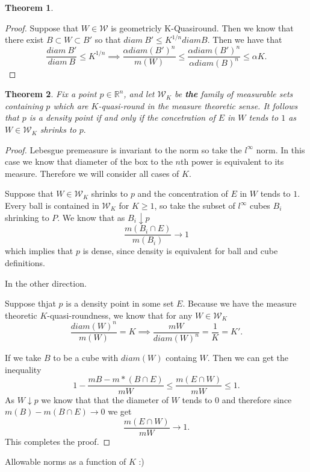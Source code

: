 \documentclass[letter]{article}
\newtheorem{theorem}{Theorem}
\newenvironment{menumerate}{%
  \edef\backupindent{\the\parindent}%
  \enumerate%
  \setlength{\parindent}{\backupindent}%
}{\endenumerate}
\begin{document}
\begin{menumerate}
\begin{theorem}
	\end{theorem}
	\begin{proof}
		Suppose that $W \in \mathcal{W} $ is geometricly K-Quasiround. Then we know that there exist $B \subset W \subset B'$
		so that $diam\ B' \leq K^{1/n} diam B.$
		Then we have that 
		\begin{equation}
				 \frac{diam\ B'}{diam\ B} \leq K^{1/n} \implies \frac{\alpha diam(B')^n}{m(W)} \leq \frac{\alpha diam(B')^n}{\alpha diam(B)^n} \leq \alpha K.
		\end{equation}
	\end{proof}
	\begin{theorem}
		Fix a point $p \in \mathbb{R}^n$, and let 
		$\mathcal{W}_K$ be \textbf{the} family of measurable sets containing $p$ which are $K$-quasi-round in the measure theoretic sense. It follows that $p$ is a density point if and only if the concetration of $E$ in $W$ tends to $1$ as $W \in \mathcal{W}_K$ shrinks to $p.$
	\end{theorem}
	\begin{proof}
		Lebesgue premeasure is invariant to the norm so take the $l^\infty$ norm. In this case we know that diameter of the box to the $n$th power 
		is equivalent to its measure. Therefore we will consider all cases of $K.$

		Suppose that $W \in \mathcal{W}_K$ shrinks to $p$ and the concentration of $E$ in $W$ tends to $1$. Every ball is contained in $\mathcal{W}_K$ for $K \geq 1$, so take
		the subset of $l^{\infty}$ cubes $B_i$ shrinking to $P$.
		We know that as $B_i \downarrow p$ 
		\begin{equation}
			\frac{m(B_i \cap E)}{m(B_i)} \to 1
		\end{equation}
		which implies that $p$ is dense, since density is equivalent for ball and cube definitions.

		In the other direction.

		Suppose thjat $p$ is a density point in some set $E.$ Because we have the measure theoretic $K$-quasi-roundness, we know that for any $W \in \mathcal{W}_K$
		\begin{equation}
			\frac{diam(W)^n}{m(W)} = K \implies \frac{mW}{diam(W)^n} = \frac{1}{K} =K'.
		\end{equation}

		If we take $B$ to be a cube with $diam(W)$ containg $W$. Then we can get the inequality
		\begin{equation}
			1 - \frac{mB - m*(B \cap E)}{mW} \leq \frac{m(E \cap W)}{mW} \leq 1.
		\end{equation}
		As $W \downarrow p$ we know that that the diameter of $W$ tends to $0$ and therefore since $m(B) - m(B \cap E) \to 0$ we get
		\begin{equation}
			\frac{m(E \cap W)}{mW} \to 1.
		\end{equation}
		This completes the proof.
	\end{proof}
	Allowable norms as a function of $K$ :)


\end{menumerate}
\end{document}
